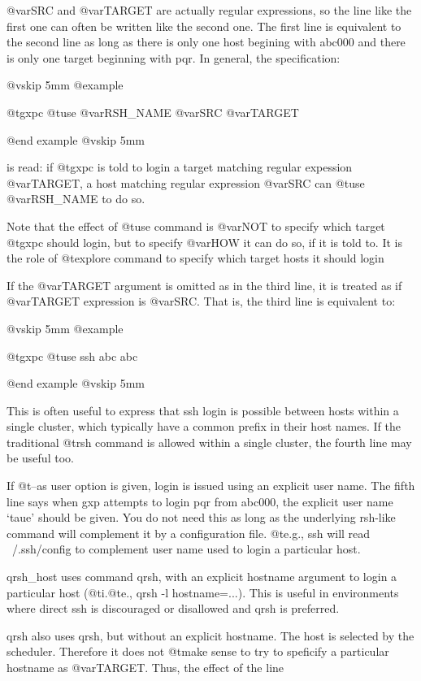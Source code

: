 @var{SRC} and @var{TARGET} are actually regular expressions, so the line like the
first one can often be written like the second one.  The first line
is equivalent to the second line as long as there is only one host
begining with abc000 and there is only one target beginning with pqr.
In general, the specification:

@vskip 5mm
@example

  @t{gxpc} @t{use} @var{RSH_NAME} @var{SRC} @var{TARGET}

@end example
@vskip 5mm

is read: if @t{gxpc} is told to login a target matching regular
expession @var{TARGET}, a host matching regular expression @var{SRC} can @t{use}
@var{RSH_NAME} to do so.

Note that the effect of @t{use} command is @var{NOT} to specify which target
@t{gxpc} should login, but to specify @var{HOW} it can do so, if it is told
to. It is the role of @t{explore} command to specify which target hosts it
should login

If the @var{TARGET} argument is omitted as in the third line, it is
treated as if @var{TARGET} expression is @var{SRC}. That is, the third line
is equivalent to:

@vskip 5mm
@example

  @t{gxpc} @t{use} ssh abc abc

@end example
@vskip 5mm

This is often useful to express that ssh login is possible
between hosts within a single cluster, which typically have a
common prefix in their host names. If the traditional @t{rsh} command
is allowed within a single cluster, the fourth line may be useful
too.

If @t{--as} user option is given, login is issued using an explicit user
name. The fifth line says when gxp attempts to login pqr from abc000,
the explicit user name `taue' should be given. You do not need this as
long as the underlying rsh-like command will complement it by a
configuration file. @t{e}.g., ssh will read ~/.ssh/config to complement
user name used to login a particular host.

qrsh_host uses command qrsh, with an explicit hostname argument
to login a particular host (@t{i}.@t{e}., qrsh -l hostname=...).  This is
useful in environments where direct ssh is discouraged or
disallowed and qrsh is preferred.

qrsh also uses qrsh, but without an explicit hostname. The host
is selected by the scheduler. Therefore it does not @t{make} sense to
try to speficify a particular hostname as @var{TARGET}.  Thus, the
effect of the line

